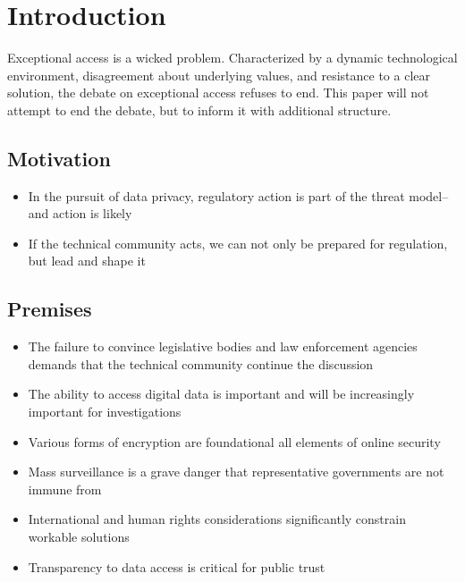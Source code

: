 \chapter{Introduction}
\label{chap-introduction}

Exceptional access is a wicked problem. Characterized by a dynamic technological environment, disagreement about
underlying values, and resistance to a clear solution, the debate on exceptional access refuses to end. This paper will
not attempt to end the debate, but to inform it with additional structure.


\section{Motivation}

\begin{itemize}
    \item In the pursuit of data privacy, regulatory action is part of the threat model--and action is likely
    \item If the technical community acts, we can not only be prepared for regulation, but lead and shape it
\end{itemize}

\section{Premises}

\begin{itemize}
    \item The failure to convince legislative bodies and law enforcement agencies demands that the technical community continue the discussion
    \item The ability to access digital data is important and will be increasingly important for investigations
    \item Various forms of encryption are foundational all elements of online security
    \item Mass surveillance is a grave danger that representative governments are not immune from
    \item International and human rights considerations significantly constrain workable solutions
    \item Transparency to data access is critical for public trust
\end{itemize}

